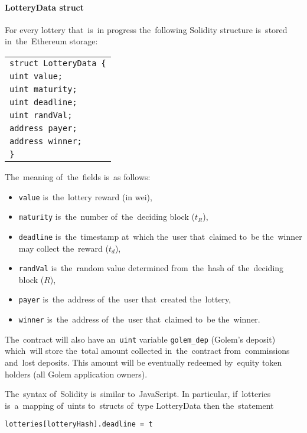 \documentclass[a4paper]{article}
\begin{document}
    \paragraph{LotteryData struct}

    For every lottery that~is~in progress the~following Solidity structure is~stored in~the~Ethereum storage:

    \begin{tabular}{l}
        \texttt{struct LotteryData \{}\\
        \qquad\texttt{uint value;}\\
        \qquad\texttt{uint maturity;}\\
        \qquad\texttt{uint deadline;}\\
        \qquad\texttt{uint randVal;}\\
        \qquad\texttt{address payer;}\\
        \qquad\texttt{address winner;}\\
        \texttt{\}}
    \end{tabular}

    The~meaning of~the~fields is~as follows:
    \begin{itemize}
        \item \texttt{value} is~the~lottery reward (in wei),
        \item \texttt{maturity} is~the~number of~the~deciding block ($t_R$),
        \item \texttt{deadline} is~the~timestamp at~which the~user that~claimed to~be the~winner may collect
            the~reward ($t_d$),
        \item \texttt{randVal} is~the~random value determined from~the~hash of~the~deciding block ($R$),
        \item \texttt{payer} is~the~address of~the~user that~created the~lottery,
        \item \texttt{winner} is~the~address of~the~user that~claimed to~be the~winner.
    \end{itemize}

    The~contract will also have an~\texttt{uint} variable \texttt{golem\_dep} (Golem's deposit) which~will store
    the~total amount collected in~the~contract from~commissions and~lost deposits. This amount will be eventually
    redeemed by~equity token holders (all Golem application owners).

    The~syntax of~Solidity is~similar to~JavaScript. In particular, if~lotteries is~a~mapping of~uints to~structs of~type LotteryData then the~statement
    \begin{center}
        \texttt{lotteries[lotteryHash].deadline = t}
    \end{center}
\end{document}
